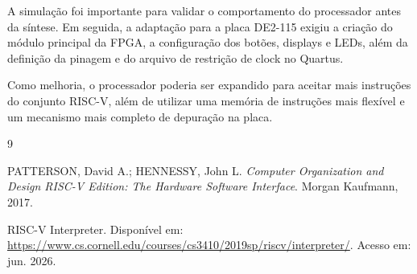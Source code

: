 \documentclass[12pt,a4paper]{article}
\begin{document}
A simulação foi importante para validar o comportamento do processador antes da síntese. Em seguida, a adaptação para a placa DE2-115 exigiu a criação do módulo principal da FPGA, a configuração dos botões, displays e LEDs, além da definição da pinagem e do arquivo de restrição de clock no Quartus.

Como melhoria, o processador poderia ser expandido para aceitar mais instruções do conjunto RISC-V, além de utilizar uma memória de instruções mais flexível e um mecanismo mais completo de depuração na placa.

\begin{thebibliography}{9}

PATTERSON, David A.; HENNESSY, John L. \textit{Computer Organization and Design RISC-V Edition: The Hardware Software Interface}. Morgan Kaufmann, 2017.

RISC-V Interpreter. Disponível em: \url{https://www.cs.cornell.edu/courses/cs3410/2019sp/riscv/interpreter/}. Acesso em: jun. 2026.

\end{thebibliography}
\end{document}
